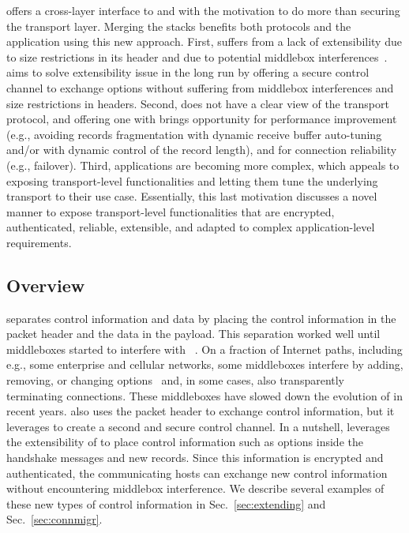 

\tcpls offers a cross-layer interface to \tls and \tcp with the motivation to do
more than securing the transport layer. Merging the stacks benefits both
protocols and the application using this new approach. First, \tcp suffers from
a lack of extensibility due to size restrictions in its header and due to
potential middlebox interferences~\cite{honda2011still}. \tcpls aims to solve
\tcp extensibility issue in the long run by offering a secure control channel to
exchange \tcp options without suffering from middlebox interferences and size
restrictions in \tcp headers. Second, \tls does not have a clear view of the
transport protocol, and offering one with \tcpls brings opportunity for
performance improvement (e.g., avoiding records fragmentation with dynamic
receive buffer auto-tuning and/or with dynamic control of the record length),
and for connection reliability (e.g., failover).  Third, applications are
becoming more complex, which appeals to exposing transport-level functionalities
and letting them tune the underlying transport to their use case. Essentially,
this last motivation discusses a novel manner to expose transport-level
functionalities that are encrypted, authenticated, reliable, extensible, and
adapted to complex application-level requirements.
\subsection{Overview}

\tcp separates control information and data by placing the control information
in the packet header and the data in the payload. This separation worked well
until middleboxes started to interfere with \tcp~\cite{10.1145/1064413.1064418,
  honda2011still, DHBVD13}.  On a fraction of Internet paths, including e.g.,
some enterprise and cellular networks, some middleboxes interfere by adding,
removing, or changing \tcp options~\cite{wang2011untold, honda2011still,
  xu2015investigating} and, in some cases, also transparently terminating \tcp
connections. These middleboxes have slowed down the evolution of \tcp in recent
years. \tcpls also uses the packet header to exchange \tcp control information,
but it leverages \tls to create a second and secure control channel. In a
nutshell, \tcpls leverages the extensibility of  to place control
information such as \tcp options inside the \tls handshake messages and new \tls
records. Since this information is encrypted and authenticated, the
communicating hosts can exchange new control information without encountering
middlebox interference. We describe several examples of these new types of
control information in Sec.~\ref{sec:extending} and Sec.~\ref{sec:connmigr}.

